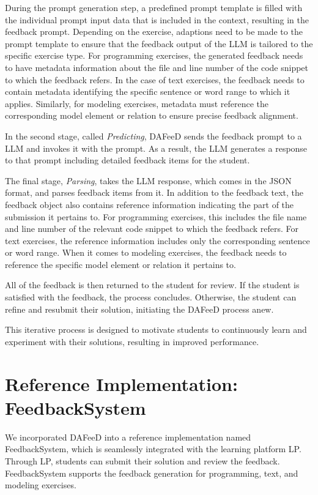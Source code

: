 \documentclass[sigconf,screen,review,anonymous]{acmart}
\begin{document}
During the prompt generation step, a predefined prompt template is filled with the individual prompt input data that is included in the context, resulting in the feedback prompt.
Depending on the exercise, adaptions need to be made to the prompt template to ensure that the feedback output of the LLM is tailored to the specific exercise type.
For programming exercises, the generated feedback needs to have metadata information about the file and line number of the code snippet to which the feedback refers.
In the case of text exercises, the feedback needs to contain metadata identifying the specific sentence or word range to which it applies.
Similarly, for modeling exercises, metadata must reference the corresponding model element or relation to ensure precise feedback alignment.

In the second stage, called \textit{Predicting}, DAFeeD sends the feedback prompt to a LLM and invokes it with the prompt. 
As a result, the LLM generates a response to that prompt including detailed feedback items for the student.

The final stage, \textit{Parsing}, takes the LLM response, which comes in the JSON format, and parses feedback items from it. 
In addition to the feedback text, the feedback object also contains reference information indicating the part of the submission it pertains to.
For programming exercises, this includes the file name and line number of the relevant code snippet to which the feedback refers.
For text exercises, the reference information includes only the corresponding sentence or word range.
When it comes to modeling exercises, the feedback needs to reference the specific model element or relation it pertains to.

All of the feedback is then returned to the student for review.
If the student is satisfied with the feedback, the process concludes. 
Otherwise, the student can refine and resubmit their solution, initiating the DAFeeD process anew.

This iterative process is designed to motivate students to continuously learn and experiment with their solutions, resulting in improved performance.

\section{Reference Implementation: FeedbackSystem} %
\label{sec:reference-implementation}

We incorporated DAFeeD into a reference implementation named FeedbackSystem, which is seamlessly integrated with the learning platform LP. 
Through LP, students can submit their solution and review the feedback.
FeedbackSystem supports the feedback generation for programming, text, and modeling exercises.
\end{document}
